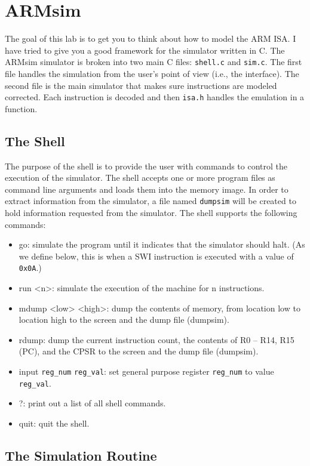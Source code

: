 \documentclass{article}
\begin{document}
\section{ARMsim}

The goal of this lab is to get you to think about how to model the ARM
ISA.  I have tried to give you a good framework for the simulator
written in C.  The ARMsim simulator is broken into two main C files:
\verb+shell.c+ and \verb+sim.c+.  The first file handles the
simulation from the user's point of view (i.e., the interface).  The
second file is the main simulator that makes sure instructions are
modeled corrected.  Each instruction is decoded and then \verb+isa.h+
handles the emulation in a function. 

\subsection{The Shell}

The purpose of the shell is to provide the user with commands to
control the execution of the simulator. The shell accepts one or more
program files as command line arguments and loads them into the memory
image. In order to extract information from the simulator, a file
named \verb+dumpsim+ will be created to hold information requested
from the simulator. The shell supports the following commands:

\begin{itemize}
\item go: simulate the program until it indicates that the simulator
  should halt. (As we define below, this is when a SWI instruction is
  executed with a value of \verb+0x0A+.)
\item run <n>: simulate the execution of the machine for n instructions.
\item mdump <low> <high>: dump the contents of memory, from location low
to location high to the screen and
the dump file (dumpsim).
\item rdump: dump the current instruction count, the contents of 
  R0 – R14, R15 (PC), and the CPSR to
the screen and the dump file (dumpsim).
\item input \verb+reg_num+ \verb+reg_val+: set general purpose
  register \verb+reg_num+ to value \verb+reg_val+.
\item ?: print out a list of all shell commands.
\item quit: quit the shell.
\end{itemize}

\subsection{The Simulation Routine}
\end{document}
